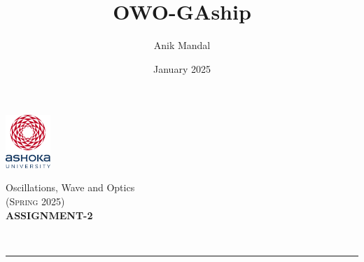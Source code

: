 \documentclass[12pt, a4paper]{article}
\title{OWO-GAship}
\author{Anik Mandal}
\date{January 2025}
\begin{document}
\begin{minipage}[t][][c]{0.1\textwidth}
    \begin{flushleft}
        \includegraphics[height=2cm]{tex-resources/Ashoka Logo.png}
    \end{flushleft}
\end{minipage}
\begin{minipage}[t][][c]{0.85\textwidth}
    \begin{center}
        {\LARGE Oscillations, Wave and Optics}\\ \vspace{0.5em}
        \textsc{(Spring 2025)}\\
        \vspace{1em}
        \textbf{\Large ASSIGNMENT-2} \\
    \end{center}
\end{minipage}
\vspace{10pt}\\
\rule[0em]{\textwidth}{0.75pt}
\end{document}
